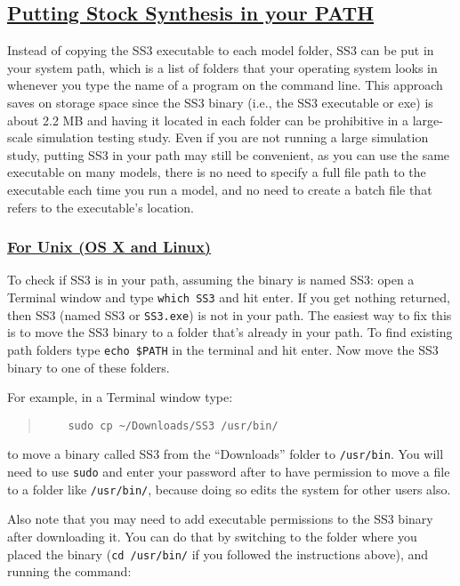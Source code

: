\hypertarget{SS3inPath}{}
\subsection[Putting Stock Synthesis in your PATH]{\protect\hyperlink{SS3inPath}{Putting Stock Synthesis in your PATH}}
Instead of copying the SS3 executable to each model folder, SS3 can be put in your system path, which is a list of folders that your operating system looks in whenever you type the name of a program on the command line. This approach saves on storage space since the SS3 binary (i.e., the SS3 executable or exe) is about 2.2 MB and having it located in each folder can be prohibitive in a large-scale simulation testing study. Even if you are not running a large simulation study, putting SS3 in your path may still be convenient, as you can use the same executable on many models, there is no need to specify a full file path to the executable each time you run a model, and no need to create a batch file that refers to the executable's location.

\hypertarget{Unix}{}
\subsubsection[For Unix (OS X and Linux)]{\protect\hyperlink{Unix}{For Unix (OS X and Linux)}}
To check if SS3 is in your path, assuming the binary is named SS3: open a Terminal window and type \texttt{which SS3} and hit enter. If you get nothing returned, then SS3 (named SS3 or \texttt{SS3.exe}) is not in your path. The easiest way to fix this is to move the SS3 binary to a folder that's already in your path. To find existing path folders type \texttt{echo \$PATH} in the terminal and hit enter. Now move the SS3 binary to one of these folders.

For example, in a Terminal window type:

\begin{quote}
   \begin{verbatim}
    sudo cp ~/Downloads/SS3 /usr/bin/
  \end{verbatim}
\end{quote}

to move a binary called SS3 from the ``Downloads'' folder to \texttt{/usr/bin}. You will need to use \texttt{sudo} and enter your password after to have permission to move a file to a folder like \texttt{/usr/bin/}, because doing so edits the system for other users also.

Also note that you may need to add executable permissions to the SS3 binary after downloading it. You can do that by switching to the folder where you placed the binary
(\texttt{cd /usr/bin/} if you followed the instructions above), and running the command:

